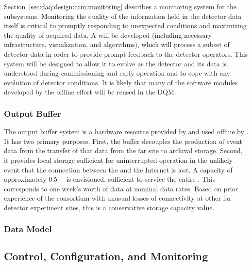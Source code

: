 Section~\ref{sec:daq:design:ccm:monitoring} describes a monitoring system for
the  subsystems. 
Monitoring the quality of the information held in the detector data itself is
critical to promptly responding to unexpected conditions and maximizing the
quality of acquired data. 
A   will be developed (including necessary
infrastructure, visualization, and algorithms), which will process a subset of
detector data in order to provide prompt feedback to the detector operators. 
This system will be designed to allow it to evolve as the detector and its data
is understood during commissioning and early operation and to cope with any
evolution of detector conditions.
It is likely that many of the software modules developed by the offline effort
will be reused in the DQM.

\subsubsection{Output Buffer}

The output buffer system is a hardware resource provided by  and used
offline by . 
It has two primary purposes. 
First, the buffer decouples the production of event data from the transfer of
that data from the far site to archival storage.
Second, it provides local storage sufficient for uninterrupted 
operation in the unlikely event that the connection between the  and
the Internet is lost. 
A capacity of approximately \SI{0.5}{\peta\byte} is envisioned, sufficient to
service the entire .
This corresponds to one week's worth of data at nominal data rates.
Based on prior experience of the consortium with unusual losses of connectivity
at other far detector experiment sites, this is a conservative storage capacity
value.

\subsubsection{Data Model}
\label{sec:daq:design-data-model}




\subsection{Control, Configuration, and Monitoring}
\label{sec:daq:design-run-control}


